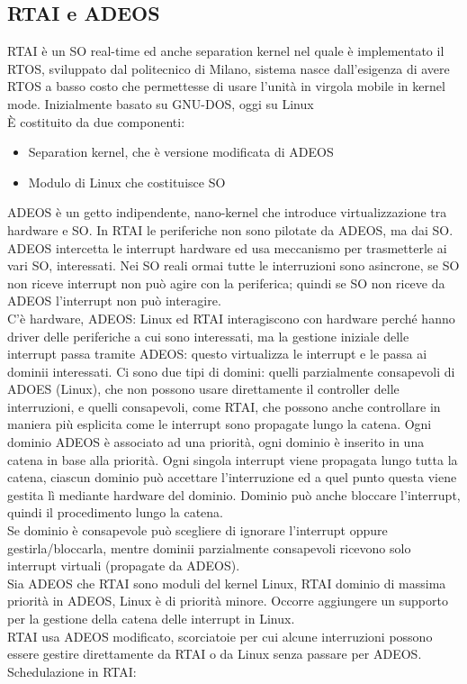 \documentclass[12pt, oneside]{extbook}
\begin{document}
\subsection{RTAI e ADEOS}
RTAI è un SO real-time ed anche separation kernel nel quale è implementato il RTOS, sviluppato dal politecnico di Milano, sistema nasce dall'esigenza di avere RTOS a basso costo che permettesse di usare l'unità in virgola mobile in kernel mode. Inizialmente basato su GNU-DOS, oggi su Linux\\ È costituito da due componenti:
\begin{itemize}
\item Separation kernel, che è versione modificata di ADEOS
\item Modulo di Linux che costituisce SO
\end{itemize}
ADEOS è un getto indipendente, nano-kernel che introduce virtualizzazione tra hardware e SO. In RTAI le periferiche non sono pilotate da ADEOS, ma dai SO. ADEOS intercetta le interrupt hardware ed usa meccanismo per trasmetterle ai vari SO, interessati. Nei SO reali ormai tutte le interruzioni sono asincrone, se SO non riceve interrupt non può agire con la periferica; quindi se SO non riceve da ADEOS l'interrupt non può interagire.\\ C'è hardware, ADEOS: Linux ed RTAI interagiscono con hardware perché hanno driver delle periferiche a cui sono interessati, ma la gestione iniziale delle interrupt passa tramite ADEOS: questo virtualizza le interrupt e le passa ai dominii interessati. Ci sono due tipi di domini: quelli parzialmente consapevoli di ADOES (Linux), che non possono usare direttamente il controller delle interruzioni, e quelli consapevoli, come RTAI, che possono anche controllare in maniera più esplicita come le interrupt sono propagate lungo la catena. Ogni dominio ADEOS è associato ad una priorità, ogni dominio è inserito in una catena in base alla priorità. Ogni singola interrupt viene propagata lungo tutta la catena, ciascun dominio può accettare l'interruzione ed a quel punto questa viene gestita lì mediante hardware del dominio. Dominio può anche bloccare l'interrupt, quindi il procedimento lungo la catena.\\ Se dominio è consapevole può scegliere di ignorare l'interrupt oppure gestirla/bloccarla, mentre dominii parzialmente consapevoli ricevono solo interrupt virtuali (propagate da ADEOS).\\ Sia ADEOS che RTAI sono moduli del kernel Linux, RTAI dominio di massima priorità in ADEOS, Linux è di priorità minore. Occorre aggiungere un supporto per la gestione della catena delle interrupt in Linux.\\ RTAI usa ADEOS modificato, scorciatoie per cui alcune interruzioni possono essere gestire direttamente da RTAI o da Linux senza passare per ADEOS.\\ Schedulazione in RTAI:
\end{document}
